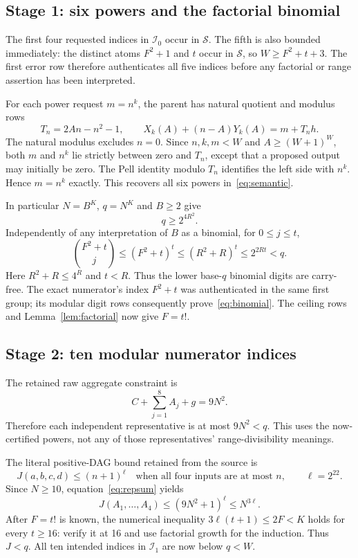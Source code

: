 \documentclass[11pt]{article}
\theoremstyle{definition}\newtheorem{definition}[theorem]{Definition}
\theoremstyle{remark}\newtheorem{remark}[theorem]{Remark}
\begin{document}
\subsection{Stage 1: six powers and the factorial binomial}

The first four requested indices in $\mathcal I_0$ occur in $\mathcal S$. The fifth is also bounded immediately: the distinct atoms $F^2+1$ and $t$ occur in $\mathcal S$, so
$W\ge F^2+t+3$. The first error row therefore authenticates all five indices before any factorial or range assertion has been interpreted.

For each power request $m=n^k$, the parent has natural quotient and modulus rows
\begin{equation}\label{eq:powergraph}
 T_n=2An-n^2-1,\qquad
 X_k(A)+(n-A)Y_k(A)=m+T_nh.
\end{equation}
The natural modulus excludes $n=0$. Since $n,k,m<W$ and $A\ge(W+1)^W$, both $m$ and $n^k$ lie strictly between zero and $T_n$, except that a proposed output may initially be zero. The Pell identity modulo $T_n$ identifies the left side with $n^k$. Hence $m=n^k$ exactly. This recovers all six powers in~\eqref{eq:semantic}.

In particular $N=B^K$, $q=N^K$ and $B\ge2$ give
\begin{equation}\label{eq:radixfirst}
 q\ge2^{4R^2}.
\end{equation}
Independently of any interpretation of $B$ as a binomial, for $0\le j\le t$,
\[
 \binom{F^2+t}{j}\le(F^2+t)^t
 \le(R^2+R)^t\le2^{2Rt}<q.
\]
Here $R^2+R\le4^R$ and $t<R$. Thus the lower base-$q$ binomial digits are carry-free. The exact numerator's index $F^2+t$ was authenticated in the same first group; its modular digit rows consequently prove~\eqref{eq:binomial}. The ceiling rows and Lemma~\ref{lem:factorial} now give $F=t!$.

\subsection{Stage 2: ten modular numerator indices}

The retained raw aggregate constraint is
\begin{equation}\label{eq:repsum}
 C+\sum_{j=1}^8A_j+g=9N^2.
\end{equation}
Therefore each independent representative is at most $9N^2<q$. This uses the now-certified powers, not any of those representatives' range-divisibility meanings.

The literal positive-DAG bound retained from the source is
\[
 J(a,b,c,d)\le(n+1)^\ell\quad\text{when all four inputs are at most }n,
 \qquad\ell=2^{22}.
\]
Since $N\ge10$, equation~\eqref{eq:repsum} yields
\[
 J(A_1,\ldots,A_4)\le(9N^2+1)^\ell\le N^{3\ell}.
\]
After $F=t!$ is known, the numerical inequality
$3\ell(t+1)\le2F<K$ holds for every $t\ge16$: verify it at 16 and use factorial growth for the induction. Thus $J<q$. All ten intended indices in $\mathcal I_1$ are now below $q<W$.
\end{document}
